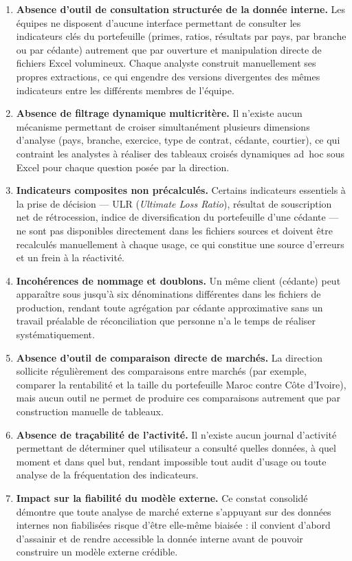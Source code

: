 \documentclass[../main.tex]{subfiles}
\begin{document}
\begin{enumerate}[leftmargin=1.5cm, itemsep=6pt, label=\textbf{BL.\arabic*}]
  \item \textbf{Absence d'outil de consultation structurée de la donnée interne.} Les équipes ne disposent d'aucune interface permettant de consulter les indicateurs clés du portefeuille (primes, ratios, résultats par pays, par branche ou par cédante) autrement que par ouverture et manipulation directe de fichiers Excel volumineux. Chaque analyste construit manuellement ses propres extractions, ce qui engendre des versions divergentes des mêmes indicateurs entre les différents membres de l'équipe.

  \item \textbf{Absence de filtrage dynamique multicritère.} Il n'existe aucun mécanisme permettant de croiser simultanément plusieurs dimensions d'analyse (pays, branche, exercice, type de contrat, cédante, courtier), ce qui contraint les analystes à réaliser des tableaux croisés dynamiques ad~hoc sous Excel pour chaque question posée par la direction.

  \item \textbf{Indicateurs composites non précalculés.} Certains indicateurs essentiels à la prise de décision --- ULR (\textit{Ultimate Loss Ratio}), résultat de souscription net de rétrocession, indice de diversification du portefeuille d'une cédante --- ne sont pas disponibles directement dans les fichiers sources et doivent être recalculés manuellement à chaque usage, ce qui constitue une source d'erreurs et un frein à la réactivité.

  \item \textbf{Incohérences de nommage et doublons.} Un même client (cédante) peut apparaître sous jusqu'à six dénominations différentes dans les fichiers de production, rendant toute agrégation par cédante approximative sans un travail préalable de réconciliation que personne n'a le temps de réaliser systématiquement.

  \item \textbf{Absence d'outil de comparaison directe de marchés.} La direction sollicite régulièrement des comparaisons entre marchés (par exemple, comparer la rentabilité et la taille du portefeuille Maroc contre Côte d'Ivoire), mais aucun outil ne permet de produire ces comparaisons autrement que par construction manuelle de tableaux.

  \item \textbf{Absence de traçabilité de l'activité.} Il n'existe aucun journal d'activité permettant de déterminer quel utilisateur a consulté quelles données, à quel moment et dans quel but, rendant impossible tout audit d'usage ou toute analyse de la fréquentation des indicateurs.

  \item \textbf{Impact sur la fiabilité du modèle externe.} Ce constat consolidé démontre que toute analyse de marché externe s'appuyant sur des données internes non fiabilisées risque d'être elle-même biaisée : il convient d'abord d'assainir et de rendre accessible la donnée interne avant de pouvoir construire un modèle externe crédible.
\end{enumerate}
\end{document}
